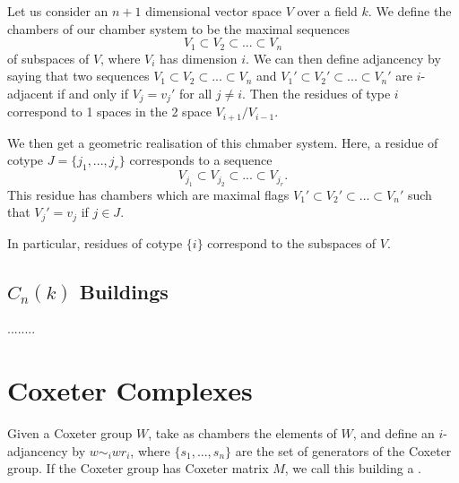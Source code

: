 \documentclass[11pt]{article}
\begin{document}
Let us consider an $n+1$ dimensional vector space $V$ over a field $k$. We define the chambers of our chamber system to be the maximal sequences \[V_1\subset V_2\subset ...\subset V_n\] of subspaces of $V$, where $V_i$ has dimension $i$. We can then define adjancency by saying that two sequences $V_1\subset V_2\subset ...\subset V_n$ and $V_1'\subset V_2'\subset ...\subset V_n'$ are $i$-adjacent if and only if $V_j=v_j'$ for all $j\neq i$. Then the residues of type $i$ correspond to 1 spaces in the 2 space $V_{i+1}/V_{i-1}$. 

We then get a geometric realisation of this chmaber system. Here, a residue of cotype $J=\{j_1,...,j_r\}$ corresponds to a sequence \[V_{j_1}\subset V_{j_2}\subset ...\subset V_{j_r}.\] This residue has chambers which are maximal flags $V_1'\subset V_2'\subset ...\subset V_n'$ such that $V_j'=v_j$ if $j\in J$. 

In particular, residues of cotype $\{i\}$ correspond to the subspaces of $V$. 

\subsection{$C_n(k)$ Buildings}

........


\section{Coxeter Complexes}

Given a Coxeter group $W$, take as chambers the elements of $W$, and define an $i$-adjancency by $w\sim_iwr_i$, where $\{s_1,...,s_n\}$ are the set of generators of the Coxeter group. If the Coxeter group has Coxeter matrix $M$, we call this building a .\\
\end{document}
